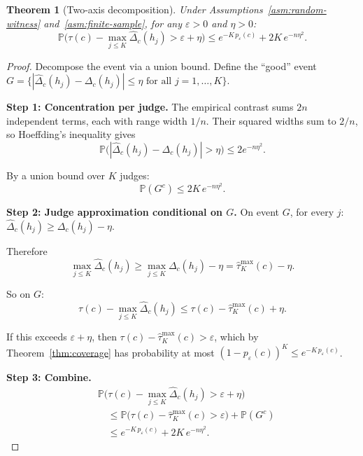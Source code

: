 \documentclass[11pt]{article}
\newtheorem{theorem}{Theorem}[section]
\newcommand{\Prob}{\mathbb{P}}
\begin{document}
\begin{theorem}[Two-axis decomposition]
\label{thm:two-axis}
Under Assumptions~\ref{asm:random-witness} and~\ref{asm:finite-sample},
for any $\varepsilon > 0$ and $\eta > 0$:
\begin{equation}
\Prob\!\Big(\tau(c) - \max_{j \le K} \widehat\Delta_c(h_j) > \varepsilon + \eta\Big)
\le e^{-K \, p_\varepsilon(c)} + 2K \, e^{-n\eta^2}.
\end{equation}
\end{theorem}

\begin{proof}
Decompose the event via a union bound. Define the ``good'' event
$G = \{|\widehat\Delta_c(h_j) - \Delta_c(h_j)| \le \eta \text{ for all }
j = 1, \ldots, K\}$.

\textbf{Step 1: Concentration per judge.}
The empirical contrast sums $2n$ independent terms, each with range width $1/n$. Their squared widths sum to $2/n$, so Hoeffding's inequality gives
\begin{equation}
\Prob\!\big(|\widehat\Delta_c(h_j) - \Delta_c(h_j)| > \eta\big)
\le 2 e^{-n\eta^2}.
\end{equation}

By a union bound over $K$ judges:
\begin{equation}
\Prob(G^c) \le 2K \, e^{-n\eta^2}.
\end{equation}

\textbf{Step 2: Judge approximation conditional on $G$.}
On event $G$, for every $j$:
$\widehat\Delta_c(h_j) \ge \Delta_c(h_j) - \eta$.

Therefore
\begin{equation}
\max_{j \le K} \widehat\Delta_c(h_j)
\ge \max_{j \le K} \Delta_c(h_j) - \eta
= \hat\tau^{\max}_K(c) - \eta.
\end{equation}

So on $G$:
\begin{equation}
\tau(c) - \max_{j \le K} \widehat\Delta_c(h_j)
\le \tau(c) - \hat\tau^{\max}_K(c) + \eta.
\end{equation}

If this exceeds $\varepsilon + \eta$, then
$\tau(c) - \hat\tau^{\max}_K(c) > \varepsilon$, which by
Theorem~\ref{thm:coverage} has probability at most
$(1 - p_\varepsilon(c))^K \le e^{-K \, p_\varepsilon(c)}$.

\textbf{Step 3: Combine.}
\begin{align}
&\Prob\!\Big(\tau(c) - \max_{j \le K} \widehat\Delta_c(h_j) > \varepsilon + \eta\Big) \\
&\quad\le \Prob\!\Big(\tau(c) - \hat\tau^{\max}_K(c) > \varepsilon\Big) + \Prob(G^c) \\
&\quad\le e^{-K \, p_\varepsilon(c)} + 2K \, e^{-n\eta^2}.
\end{align}
\end{proof}
\end{document}
